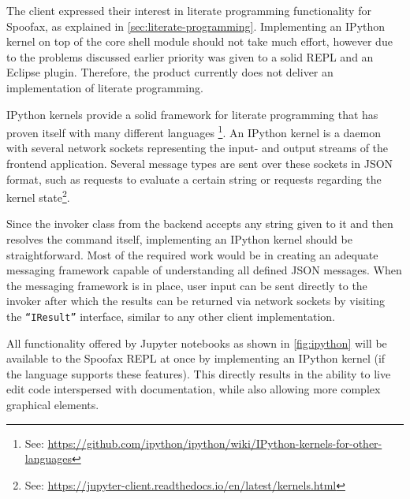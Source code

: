 The client expressed their interest in literate programming functionality for
Spoofax, as explained in \cref{sec:literate-programming}. Implementing an
IPython kernel on top of the core shell module should not take much effort,
however due to the problems discussed earlier priority was given to a solid
REPL and an Eclipse plugin. Therefore, the product currently does not deliver an
implementation of literate programming.

IPython kernels provide a solid framework for literate programming that has
proven itself with many different languages%
\footnote{See: \url{https://github.com/ipython/ipython/wiki/IPython-kernels-for-other-languages}}.
An IPython kernel is a daemon with several network sockets
representing the input- and output streams of the frontend application. Several
message types are sent over these sockets in JSON format, such as requests to
evaluate a certain string or requests regarding the kernel
state\footnote{See: \url{https://jupyter-client.readthedocs.io/en/latest/kernels.html}}.

Since the invoker class from the backend accepts any string given to it and then
resolves the command itself, implementing an IPython kernel should be
straightforward. Most of the required work would be in creating an adequate
messaging framework capable of understanding all defined JSON messages. When the
messaging framework is in place, user input can be sent directly to the invoker
after which the results can be returned via network sockets by visiting the
\texttt{``IResult''} interface, similar to any other client implementation.

All functionality offered by Jupyter notebooks as shown in \cref{fig:ipython}
will be available to the Spoofax REPL at once by implementing an IPython kernel
(if the language supports these features). This directly results in the
ability to live edit code interspersed with documentation, while also allowing
more complex graphical elements.

